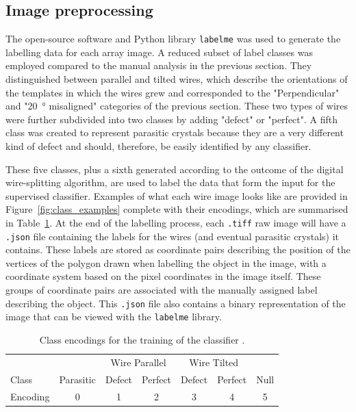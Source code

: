 \subsection{Image preprocessing}

The open-source software and Python \cite{python} library \texttt{labelme} \cite{labelme2016} was used to generate the labelling data for each array image. A reduced subset of label classes was employed compared to the manual analysis in the previous section. They distinguished between parallel and tilted wires, which describe the orientations of the templates in which the wires grew and corresponded to the "Perpendicular" and "\qty{20}{\degree} misaligned" categories of the previous section. These two types of wires were further subdivided into two classes by adding "defect" or "perfect". A fifth class was created to represent parasitic crystals because they are a very different kind of defect and should, therefore, be easily identified by any classifier.

These five classes, plus a sixth generated according to the outcome of the digital wire-splitting algorithm, are used to label the data that form the input for the supervised classifier. Examples of what each wire image looks like are provided in Figure~\ref{fig:class_examples} complete with their encodings, which are summarised in Table~\ref{tab:encodings}. At the end of the labelling process, each \texttt{.tiff} raw image will have a \texttt{.json} file containing the labels for the wires (and eventual parasitic crystals) it contains. These labels are stored as coordinate pairs describing the position of the vertices of the polygon drawn when labelling the object in the image, with a coordinate system based on the pixel coordinates in the image itself. These groups of coordinate pairs are associated with the manually assigned label describing the object. This \texttt{.json} file also contains a binary representation of the image that can be viewed with the \texttt{labelme} library.

\begin{table}
    \centering
    \caption[Class encodings for the training of the classifier.]{Class encodings for the training of the classifier \cite{Brugnolotto2024}.}
    \begin{tabular}{l|c|c c|c c|c}
        & & \multicolumn{2}{c|}{Wire Parallel} & \multicolumn{2}{c|}{Wire Tilted} & \\ 
        Class & Parasitic & Defect & Perfect & Defect & Perfect & Null \\ \hline \hline
        Encoding & \num{0} & \num{1} & \num{2} & \num{3} & \num{4} & \num{5}
    \end{tabular}
    \label{tab:encodings}
\end{table}

